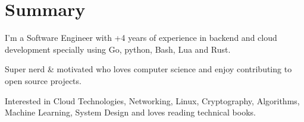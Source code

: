 \section{Summary}\closesection{}

I'm a Software Engineer with +4 years of experience in backend and cloud development specially using Go, python, Bash, Lua and Rust.

Super nerd \& motivated who loves computer science and enjoy contributing to open source projects.

Interested in Cloud Technologies, Networking, Linux, Cryptography, Algorithms, Machine Learning, System Design and loves reading technical books.

